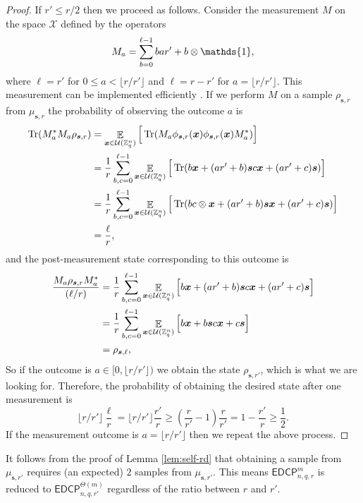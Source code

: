 \documentclass[11pt]{article}
\theoremstyle{plain}
\theoremstyle{definition}
\DeclareMathOperator{\tr}{Tr} %
\DeclareMathOperator{\E}{\mathbb{E}}
\let\ket\relax
\DeclarePairedDelimiter{\ket}{\lvert}{\rangle}
\let\bra\relax
\DeclarePairedDelimiter{\bra}{\langle}{\rvert}
\def\Z{\mathbb{Z}}
\def\edcp{\mathsf{EDCP}}
\def\X{\mathcal{X}}
\def\U{\mathcal{U}}
\begin{document}
\begin{proof}
    If $r' \le r / 2$ then we proceed as follows. Consider the measurement $M$ on the space $\X$ defined by the operators
    \[ M_a = \sum_{b = 0}^{\ell - 1} \ket{b}\bra{ar' + b} \otimes \mathds{1}, \]
    where $\ell = r'$ for $0 \le a < \lfloor r / r'  \rfloor$ and $\ell = r - r'$ for $a = \lfloor r / r'  \rfloor$. This measurement can be implemented efficiently \cite[\S A.8]{kaye2007introduction}. If we perform $M$ on a sample $\rho_{\bm{s}, r}$ from $\mu_{\bm{s}, r}$ the probability of observing the outcome $a$ is
    \begin{align*}
        \tr(M_a^*M_a \rho_{\bm{s}, r})
        & = \E_{\bm{x} \in \U(\Z_q^n)} \Big[ \tr(M_a \ket{\phi_{\bm{s}, r}(\bm{x})} \bra{\phi_{\bm{s}, r}(\bm{x})} M_a^*) \Big] \\
        & = \frac{1}{r} \sum_{b, c = 0}^{\ell - 1} \E_{\bm{x} \in \U(\Z_q^n)}\Big[ \tr(\ket{b}\ket{\bm{x} + (ar' + b)\bm{s}} \bra{c}\bra{\bm{x} + (ar' + c)\bm{s}}) \Big] \\
        & = \frac{1}{r} \sum_{b, c = 0}^{\ell - 1} \E_{\bm{x} \in \U(\Z_q^n)}\Big[ \tr(\ket{b}\bra{c} \otimes \ket{\bm{x} + (ar' + b)\bm{s}} \bra{\bm{x} + (ar' + c)\bm{s}}) \Big] \\
        & = \frac{\ell}{r},
    \end{align*}
    and the post-measurement state corresponding to this outcome is
    \begin{align*}
        \frac{M_a \rho_{\bm{s}, r} M_a^*}{(\ell / r)}
        & = \frac{1}{r} \sum_{b, c = 0}^{\ell - 1} \E_{\bm{x} \in \U(\Z_q^n)}\Big[ \ket{b}\ket{\bm{x} + (ar' + b)\bm{s}} \bra{c}\bra{\bm{x} + (ar' + c)\bm{s}} \Big] \\
        & = \frac{1}{r} \sum_{b, c = 0}^{\ell - 1} \E_{\bm{x} \in \U(\Z_q^n)}\Big[ \ket{b}\ket{\bm{x} + b\bm{s}} \bra{c}\bra{\bm{x} + c\bm{s}} \Big] \\
        & = \rho_{\bm{s}, \ell},
    \end{align*}
    So if the outcome is $a \in [0, \lfloor r / r'  \rfloor)$ we obtain the state $\rho_{\bm{s}, r'}$, which is what we are looking for. Therefore, the probability of obtaining the desired state after one measurement is
    \[ \lfloor r / r' \rfloor \frac{\ell}{r} = \lfloor r / r' \rfloor \frac{r'}{r} \ge \left( \frac{r}{r'} - 1 \right)\frac{r}{r'} = 1 - \frac{r'}{r} \ge \frac{1}{2}. \]
    If the measurement outcome is $a = \lfloor r / r' \rfloor$ then we repeat the above process.
\end{proof}

It follows from the proof of Lemma \ref{lem:self-rd} that obtaining a sample from $\mu_{\bm{s}, r'}$ requires (an expected) $2$ samples from $\mu_{\bm{s}, r'}$. This means $\edcp_{n, q, r}^m$ is reduced to $\edcp_{n, q, r'}^{\Theta(m)}$ regardless of the ratio between $r$ and $r'$.
\end{document}

